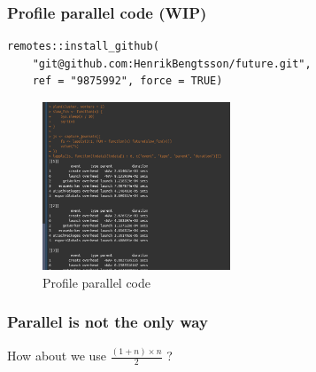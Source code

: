 \documentclass[aspectratio=169,xcolor={dvipsnames,table}]{beamer}
\begin{document}
\begin{frame}[fragile]
  \frametitle{Profile parallel code (WIP)}
  \begin{verbatim}
remotes::install_github(
    "git@github.com:HenrikBengtsson/future.git", 
    ref = "9875992", force = TRUE)
\end{verbatim}
  \begin{figure}[htbp]
    \centering
    \includegraphics[width = 0.5\textwidth]{future_journal}
    \caption{Profile parallel code}
  \end{figure}
\end{frame}


\begin{frame}
  \frametitle{Parallel is not the only way}
  How about we use $\frac{(1 + n) \times n}{2}$ ?
\end{frame}



\end{document}
